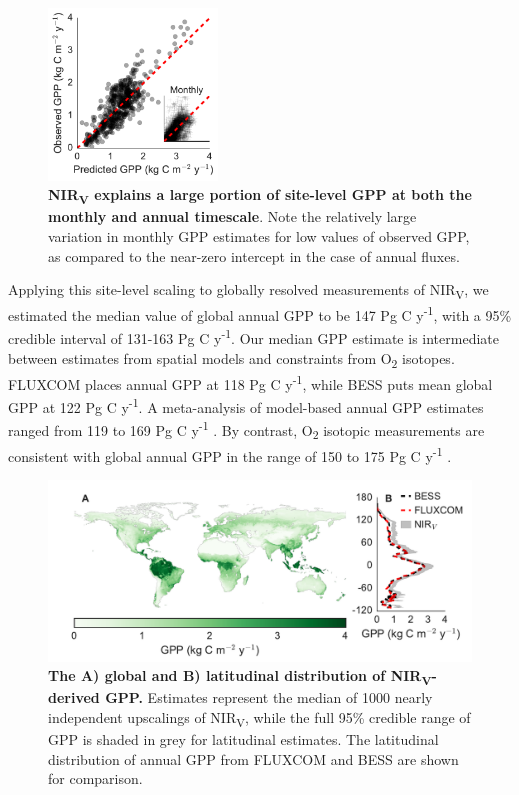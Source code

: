 \documentclass[10pt,letterpaper]{article}
\begin{document}
\begin{figure}[t]
    \centering
    \includegraphics[width=0.4\textwidth, keepaspectratio]{figure_validation_inset.pdf}
    \caption{\textbf{NIR\textsubscript{V} explains a large portion of site-level GPP at both the monthly and annual timescale}. Note the relatively large variation in monthly GPP estimates for low values of observed GPP, as compared to the near-zero intercept in the case of annual fluxes.}
    \label{fig:site_validation}
\end{figure}

Applying this site-level scaling to globally resolved measurements of NIR\textsubscript{V}, we estimated the median value of global annual GPP to be 147 Pg C y\textsuperscript{-1}, with a 95\% credible interval of 131-163 Pg C y\textsuperscript{-1}. Our median GPP estimate is intermediate between estimates from spatial models and constraints from O\textsubscript{2} isotopes. FLUXCOM places annual GPP at 118 Pg C y\textsuperscript{-1}, while BESS puts mean global GPP at 122 Pg C y\textsuperscript{-1}.  A meta-analysis of model-based annual GPP estimates ranged from 119 to 169 Pg C y\textsuperscript{-1} \cite{Anav2015}. By contrast, O\textsubscript{2} isotopic measurements are consistent with global annual GPP in the range of 150 to 175 Pg C y\textsuperscript{-1} \cite{Welp2011}. 

\begin{figure}
    \centering
    \includegraphics[width=\textwidth, keepaspectratio]{figure_nirv_gpp_map_area.pdf}
    \caption{\textbf{The A) global and B) latitudinal distribution of NIR\textsubscript{V}-derived GPP.}  Estimates represent the median of 1000 nearly independent upscalings of NIR\textsubscript{V}, while the full 95\% credible range of GPP is shaded in grey for latitudinal estimates. The latitudinal distribution of annual GPP from FLUXCOM and BESS are shown for comparison. }
    \label{fig:gpp_map}
\end{figure}
\end{document}
